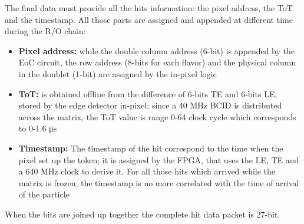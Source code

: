     The final data must provide all the hits information: the pixel address, the ToT and the timestamp. All those parts are assigned and appended at different time during the R/O chain:  
    \begin{itemize}
        \item\textbf{Pixel address:} while the double column address (6-bit) is appended by the EoC circuit, the row address (8-bits for each flavor) and the physical column in the doublet (1-bit) are assigned by the in-pixel logic      
        \item \textbf{ToT:} is obtained offline from the difference of 6-bits TE and 6-bits LE, stored by the edge detector in-pixel; since a 40 MHz BCID is distributed across the matrix, the ToT value is range 0-64 clock cycle which corresponds to 0-1.6 \si{\us}  
        \item \textbf{Timestamp:} The timestamp of the hit correspond to the time when the pixel set up the token; it is assigned by the FPGA, that uses the LE, TE and a 640 MHz clock to derive it. For all those hits which arrived while the matrix is frozen, the timestamp is no more correlated with the time of arrival of the particle         
    \end{itemize}
    When the bits are joined up together the complete hit data packet is 27-bit. 
